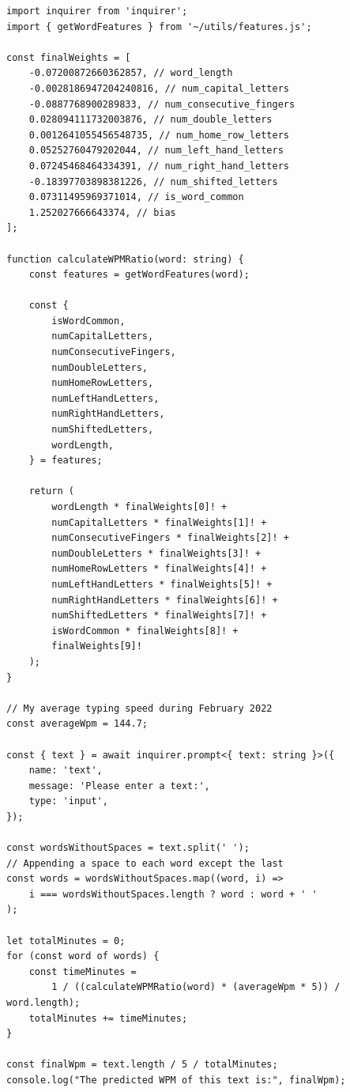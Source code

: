 \documentclass[12pt]{article}
\begin{document}
\begin{verbatim}
import inquirer from 'inquirer';
import { getWordFeatures } from '~/utils/features.js';

const finalWeights = [
	-0.07200872660362857, // word_length
	-0.0028186947204240816, // num_capital_letters
	-0.0887768900289833, // num_consecutive_fingers
	0.028094111732003876, // num_double_letters
	0.0012641055456548735, // num_home_row_letters
	0.05252760479202044, // num_left_hand_letters
	0.07245468464334391, // num_right_hand_letters
	-0.18397703898381226, // num_shifted_letters
	0.07311495969371014, // is_word_common
	1.252027666643374, // bias
];

function calculateWPMRatio(word: string) {
	const features = getWordFeatures(word);

	const {
		isWordCommon,
		numCapitalLetters,
		numConsecutiveFingers,
		numDoubleLetters,
		numHomeRowLetters,
		numLeftHandLetters,
		numRightHandLetters,
		numShiftedLetters,
		wordLength,
	} = features;

	return (
		wordLength * finalWeights[0]! +
		numCapitalLetters * finalWeights[1]! +
		numConsecutiveFingers * finalWeights[2]! +
		numDoubleLetters * finalWeights[3]! +
		numHomeRowLetters * finalWeights[4]! +
		numLeftHandLetters * finalWeights[5]! +
		numRightHandLetters * finalWeights[6]! +
		numShiftedLetters * finalWeights[7]! +
		isWordCommon * finalWeights[8]! +
		finalWeights[9]!
	);
}

// My average typing speed during February 2022
const averageWpm = 144.7;

const { text } = await inquirer.prompt<{ text: string }>({
	name: 'text',
	message: 'Please enter a text:',
	type: 'input',
});

const wordsWithoutSpaces = text.split(' ');
// Appending a space to each word except the last
const words = wordsWithoutSpaces.map((word, i) =>
	i === wordsWithoutSpaces.length ? word : word + ' '
);

let totalMinutes = 0;
for (const word of words) {
	const timeMinutes =
		1 / ((calculateWPMRatio(word) * (averageWpm * 5)) / word.length);
	totalMinutes += timeMinutes;
}

const finalWpm = text.length / 5 / totalMinutes;
console.log("The predicted WPM of this text is:", finalWpm);
\end{verbatim}
\end{document}
